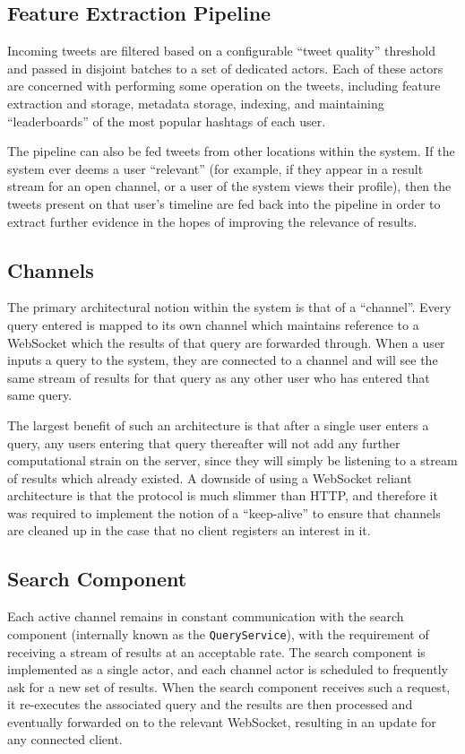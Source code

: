 \documentclass{l4proj}
\newcommand{\code}[1]{\texttt{#1}}
\begin{document}
        \subsection{Feature Extraction Pipeline}
        Incoming tweets are filtered based on a configurable “tweet quality” threshold and passed in disjoint batches to a set of dedicated actors. Each of these actors are concerned with performing some operation on the tweets, including feature extraction and storage, metadata storage, indexing, and maintaining “leaderboards” of the most popular hashtags of each user.

The pipeline can also be fed tweets from other locations within the system. If the system ever deems a user “relevant” (for example, if they appear in a result stream for an open channel, or a user of the system views their profile), then the tweets present on that user’s timeline are fed back into the pipeline in order to extract further evidence in the hopes of improving the relevance of results.
        
        \subsection{Channels}
        The primary architectural notion within the system is that of a “channel”. Every query entered is mapped to its own channel which maintains reference to a WebSocket which the results of that query are forwarded through. When a user inputs a query to the system, they are connected to a channel and will see the same stream of results for that query as any other user who has entered that same query. 

The largest benefit of such an architecture is that after a single user enters a query, any users entering that query thereafter will not add any further computational strain on the server, since they will simply be listening to a stream of results which already existed. A downside of using a WebSocket reliant architecture is that the protocol is much slimmer than HTTP, and therefore it was required to implement the notion of a “keep-alive” to ensure that channels are cleaned up in the case that no client registers an interest in it.
        
        \subsection{Search Component}
        Each active channel remains in constant communication with the search component (internally known as the \code{QueryService}), with the requirement of receiving a stream of results at an acceptable rate. The search component is implemented as a single actor, and each channel actor is scheduled to frequently ask for a new set of results. When the search component receives such a request, it re-executes the associated query and the results are then processed and eventually forwarded on to the relevant WebSocket, resulting in an update for any connected client.
\end{document}
